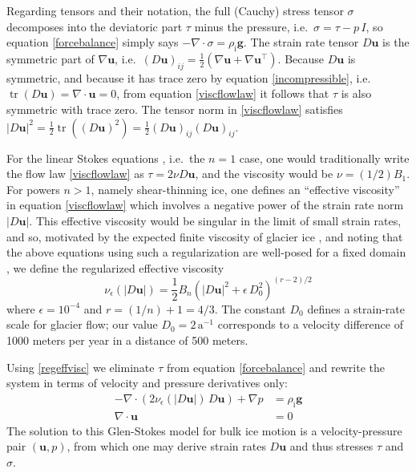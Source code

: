 \documentclass[letterpaper,final,12pt,reqno]{amsart}
\newcommand{\eps}{\epsilon}
\newcommand{\grad}{\nabla}
\newcommand{\Div}{\nabla\cdot}
\newcommand{\trace}{\operatorname{tr}}
\newcommand{\bg}{\mathbf{g}}
\newcommand{\bu}{\mathbf{u}}
\newcommand{\rhoi}{\rho_{\text{i}}}
\begin{document}
Regarding tensors and their notation, the full (Cauchy) stress tensor $\sigma$ \cite{GreveBlatter2009} decomposes into the deviatoric part $\tau$ minus the pressure, i.e.~$\sigma = \tau - p\,I$, so equation \eqref{forcebalance} simply says $-\Div \sigma = \rhoi \bg$.  The strain rate tensor $D\bu$ is the symmetric part of $\grad \bu$, i.e.~$(D\bu)_{ij} = \frac{1}{2} \left(\grad\bu + \grad\bu^\top\right)$.  Because $D\bu$ is symmetric, and because it has trace zero by equation \eqref{incompressible}, i.e.~$\trace(D\bu)=\nabla \cdot \bu = 0$, from equation \eqref{viscflowlaw} it follows that $\tau$ is also symmetric with trace zero.  The tensor norm in \eqref{viscflowlaw} satisfies $|D\bu|^2 = \frac{1}{2} \trace\left((D\bu)^2\right) = \frac{1}{2} (D\bu)_{ij} (D\bu)_{ij}$.

For the linear Stokes equations \cite{Elmanetal2014}, i.e.~the $n=1$ case, one would traditionally write the flow law \eqref{viscflowlaw} as $\tau = 2\nu D\bu$, and the viscosity would be $\nu = (1/2) B_1$.  For powers $n>1$, namely shear-thinning ice, one defines an ``effective viscosity'' in equation \eqref{viscflowlaw} which involves a negative power of the strain rate norm $|D\bu|$.  This effective viscosity would be singular in the limit of small strain rates, and so, motivated by the expected finite viscosity of glacier ice \cite{GreveBlatter2009}, and noting that the above equations using such a regularization are well-posed for a fixed domain \cite{JouvetRappaz2011}, we define the regularized effective viscosity
\begin{equation}
\nu_\eps(|D\bu|) = \frac{1}{2} B_n \left(|D\bu|^2 + \eps\, D_0^2\right)^{(r-2)/2} \label{regeffvisc}
\end{equation}
where $\eps = 10^{-4}$ and $r=(1/n)+1=4/3$.  The constant $D_0$ defines a strain-rate scale for glacier flow; our value $D_0 = 2 \,\text{a}^{-1}$ corresponds to a velocity difference of 1000 meters per year in a distance of 500 meters.

Using \eqref{regeffvisc} we eliminate $\tau$ from equation \eqref{forcebalance} and rewrite the system in terms of velocity and pressure derivatives only:
\begin{align}
- \nabla \cdot \left(2 \nu_\eps(|D\bu|)\, D\bu\right) + \nabla p &= \rhoi \mathbf{g} \label{stokes} \\
\Div \bu &= 0 \label{incompagain}
\end{align}
The solution to this Glen-Stokes model for bulk ice motion is a velocity-pressure pair $(\bu,p)$, from which one may derive strain rates $D\bu$ and thus stresses $\tau$ and $\sigma$.
\end{document}
